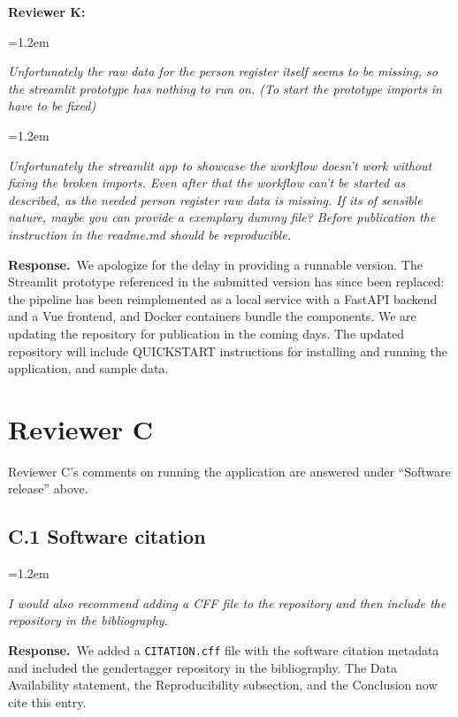 \documentclass[11pt,a4paper]{article}
\newenvironment{reviewercomment}
  {\par\smallskip\begin{list}{}{\leftmargin=1.2em\rightmargin=0pt}\item[]\color{black!75}\itshape}
  {\end{list}\smallskip}
\newcommand{\response}{\par\noindent\textbf{Response.}~}
\begin{document}
\textbf{Reviewer K:}
\begin{reviewercomment}
Unfortunately the raw data for the person register itself seems to be missing, so the streamlit
prototype has nothing to run on. (To start the prototype imports in
 have to be fixed)
\end{reviewercomment}
\begin{reviewercomment}
Unfortunately the streamlit app to showcase the workflow doesn't work without fixing the broken
imports. Even after that the workflow can't be started as described, as the needed person register
raw data is missing. If its of sensible nature, maybe you can provide a exemplary dummy file? Before
publication the instruction in the readme.md should be reproducible.
\end{reviewercomment}

\response We apologize for the delay in providing a runnable version. The Streamlit prototype
referenced in the submitted version has since been replaced: the pipeline has been reimplemented as a
local service with a FastAPI backend and a Vue frontend, and Docker containers bundle the components.
We are updating the repository for publication in the coming days.
The updated repository will include QUICKSTART instructions for installing and running the
application, and sample data.

\section*{Reviewer C}

Reviewer C's comments on running the application are answered under ``Software release'' above.

\subsection*{C.1 Software citation}

\begin{reviewercomment}
I would also recommend adding a CFF file to the repository and then include the repository in the
bibliography.
\end{reviewercomment}

\response We added a \texttt{CITATION.cff} file with the software citation metadata and included the
gendertagger repository in the bibliography. The Data Availability statement, the Reproducibility
subsection, and the Conclusion now cite this entry.
\end{document}
